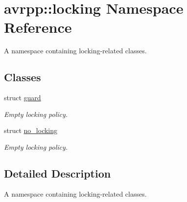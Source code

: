 \hypertarget{namespaceavrpp_1_1locking}{
\section{avrpp::locking Namespace Reference}
\label{namespaceavrpp_1_1locking}
}


A namespace containing locking-\/related classes.  


\subsection*{Classes}
\begin{DoxyCompactItemize}
\item 
struct \hyperlink{structavrpp_1_1locking_1_1guard}{guard}
\begin{DoxyCompactList}\small\item\em Empty locking policy. \item\end{DoxyCompactList}\item 
struct \hyperlink{structavrpp_1_1locking_1_1no__locking}{no\_\-locking}
\begin{DoxyCompactList}\small\item\em Empty locking policy. \item\end{DoxyCompactList}\end{DoxyCompactItemize}


\subsection{Detailed Description}
A namespace containing locking-\/related classes. 